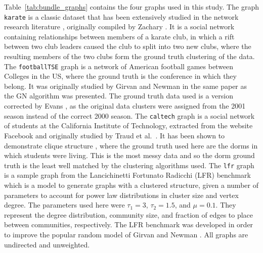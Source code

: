 Table~\ref{tab:bundle_graphs} contains the four graphs used in this study.
The graph \texttt{karate} is a classic dataset that has been extensively studied in the network research literature \cite{Fortunato2016}, originally compiled by Zachary \cite{Zachary1977}. It is a social network containing relationships between members of a karate club, in which a rift between two club leaders caused the club to split into two new clubs, where the resulting members of the two clubs form the ground truth clustering of the data.
The \texttt{footballTSE} graph is a network of American football games between Colleges in the US, where the ground truth is the conference in which they belong. It was originally studied by Girvan and Newman \cite{Girvan2002} in the same paper as the GN algorithm was presented. The ground truth data used is a version corrected by Evans \cite{Evans2010}, as the original data clusters were assigned from the 2001 season instead of the correct 2000 season. 
The \texttt{caltech} graph is a social network of students at the California Institute of Technology, extracted from the website Facebook and originally studied by Traud et al.\ \cite{Traud2012}. It has been shown to demonstrate clique structure \cite{Nocaj2015}, where the ground truth used here are the dorms in which students were living. This is the most messy data and so the dorm ground truth is the least well matched by the clustering algorithms used.
The \texttt{lfr} graph is a sample graph from the Lancichinetti Fortunato Radicchi (LFR) benchmark \cite{Lancichinetti2008} which is a model to generate graphs with a clustered structure, given a number of parameters to account for power law distributions in cluster size and vertex degree. The parameters used here were $\tau_1=3$, $\tau_2=1.5$, and $\mu=0.1$. They represent the degree distribution, community size, and fraction of edges to place between communities, respectively. The LFR benchmark was developed in order to improve the popular random model of Girvan and Newman \cite{Girvan2002}.
All graphs are undirected and unweighted.

